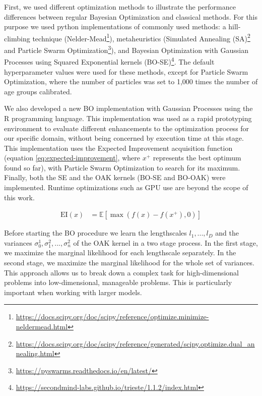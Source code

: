 \documentclass{IOS-Book-Article}
\begin{document}
	First, we used different optimization methods to illustrate the performance differences between regular Bayesian Optimization and classical methods. For this purpose we used python implementations of commonly used methods: a hill-climbing technique (Nelder-Mead\footnote{\url{https://docs.scipy.org/doc/scipy/reference/optimize.minimize-neldermead.html}}\cite{nelder-mead}), metaheuristics (Simulated Annealing (SA)\footnote{\url{https://docs.scipy.org/doc/scipy/reference/generated/scipy.optimize.dual_annealing.html}}\cite{simulated-annealing} and Particle Swarm Optimization\footnote{\url{https://pyswarms.readthedocs.io/en/latest/}}\cite{pso}), and Bayesian Optimization with Gaussian Processes using Squared Exponential kernels (BO-SE)\footnote{\url{https://secondmind-labs.github.io/trieste/1.1.2/index.html}}. The default hyperparameter values were used for these methods, except for Particle Swarm Optimization, where the number of particles was set to 1,000 times the number of age groups calibrated.
	
	We also developed a new BO implementation with Gaussian Processes using the R programming language. This implementation was used as a rapid prototyping environment to evaluate different enhancements to the optimization process for our specific domain, without being concerned by execution time at this stage. This implementation uses the Expected Improvement acquisition function (equation \ref{eq:expected-improvement}, where $x^+$ represents the best optimum found so far), with Particle Swarm Optimization to search for its maximum. Finally, both the SE and the OAK kernels (BO-SE and BO-OAK) were implemented. Runtime optimizations such as GPU use are beyond the scope of this work.
	
	\begin{equation} \label{eq:expected-improvement}
		\begin{aligned}
			\text{EI}(x) &= \mathbb{E}[\max(f(x)-f(x^+), 0)]
		\end{aligned}
	\end{equation}

	Before starting the BO procedure we learn the lengthscales $l_1, ..., l_D$ and the variances $\sigma_0^1, \sigma_1^2, ..., \sigma_n^2$ of the OAK kernel in a two stage process. In the first stage, we maximize the marginal likelihood for each lengthscale separately. In the second stage, we maximize the marginal likelihood for the whole set of variances. This approach allows us to break down a complex task for high-dimensional problems into low-dimensional, manageable problems. This is particularly important when working with larger models.
	
\end{document}
